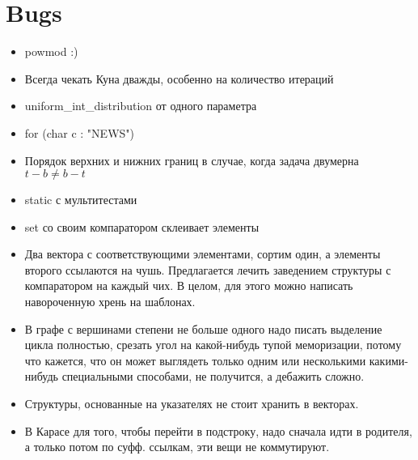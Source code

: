 \section{Bugs}

\begin{itemize}
    \item powmod :)

    \item Всегда чекать Куна дважды, особенно на количество итераций
    
    \item uniform\_int\_distribution от одного параметра
    
    \item for (char c : "NEWS")
    
    \item Порядок верхних и нижних границ в случае, когда задача двумерна
    $t - b \neq b - t$
    
    \item static с мультитестами

    \item set со своим компаратором склеивает элементы

    \item Два вектора с соответствующими элементами, сортим один, а элементы
    второго ссылаются на чушь. Предлагается лечить заведением структуры с
    компаратором на каждый чих. В целом, для этого можно написать навороченную
    хрень на шаблонах.

    \item В графе с вершинами степени не больше одного надо писать выделение
    цикла полностью, срезать угол на какой-нибудь тупой меморизации, потому
    что кажется, что он может выглядеть только одним или несколькими
    какими-нибудь специальными способами, не получится, а дебажить сложно.

	\item Структуры, основанные на указателях не стоит хранить в векторах.

	\item В Карасе для того, чтобы перейти в подстроку, надо сначала идти в
	родителя, а только потом по суфф. ссылкам, эти вещи не коммутируют.
\end{itemize}
